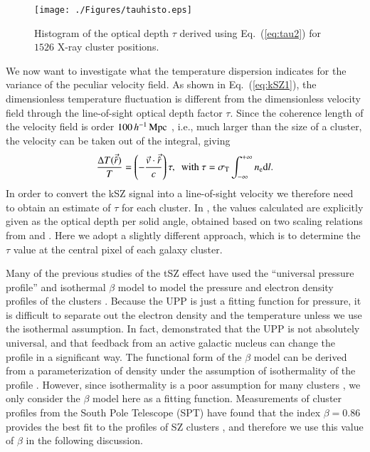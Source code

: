 \documentclass[traditabstract, longauth]{aa}
\newcommand{\1}{\'\i }
\def \der {{\rm d}}
\begin{document}
\begin{figure}
\centering
\texttt{[image: ./Figures/tauhisto.eps]}
\caption[fig:tau]{Histogram of the optical depth $\tau$ derived using
Eq.~(\ref{eq:tau2}) for $1526$ X-ray cluster positions.}
\label{fig:tau}
\end{figure}

We now want to investigate what the temperature dispersion indicates for the
variance of the peculiar velocity field. As shown in Eq.~(\ref{eq:kSZ1}), the
dimensionless temperature fluctuation is different from the dimensionless
velocity field through the line-of-sight optical depth factor $\tau$. Since the coherence
length of the velocity field is order $100\,h^{-1}\,{\rm Mpc}$
\citep{planck2015-XXXVII}, i.e., much larger than the size of a cluster,
the velocity can be taken out of the integral,
giving
\begin{eqnarray}
  \frac{\Delta T(\vec{\hat{r}})}{T} =\left(-\frac{\vec{v}\cdot
  \vec{\hat{r}}}{c} \right)\tau, \,\,\, {\rm with}\ \tau=\sigma_{\rm
  T}\int^{+\infty}_{-\infty} n_{\rm e}\der l.
\end{eqnarray}
In order to convert the kSZ signal into a line-of-sight velocity we
therefore need to obtain an estimate of $\tau$ for each
cluster. In \cite{planck2013-XIII}, the values calculated are explicitly given
as the optical depth per solid angle, obtained based on two scaling
relations from \cite{Arnaud05} and \cite{Arnaud10}. Here we adopt a slightly
different approach, which is to determine the $\tau$ value at the central
pixel of each galaxy cluster.

Many of the previous studies of the tSZ effect have used the ``universal
pressure profile'' \citep[UPP,][]{Arnaud10,planck2012-V} and isothermal
$\beta$ model \citep{Cavaliere76,Cavaliere78} to model the pressure and
electron density profiles of the
clusters \citep{Grego00,bensonetal03,Benson04,Hallman07,Halverson09,Plagge10}.
Because the UPP is just a fitting function for pressure, it is difficult to
separate out the electron density and the temperature unless we use
the isothermal assumption. In fact,  \citet{Battaglia12} demonstrated that the
UPP is not absolutely universal, and that feedback from an active galactic
nucleus can change the profile in a significant way. The functional form of the
$\beta$ model can be derived from a parameterization of density under the
assumption of isothermality of the profile \citep[e.g.,][]{Sarazin86}.
However, since isothermality is a poor assumption for many
clusters \citep{planck2012-V}, we only consider the $\beta$ model here as a
fitting function. Measurements of cluster profiles from the South Pole
Telescope (SPT) have found that the index $\beta=0.86$ provides the best fit
to the profiles of SZ clusters \citep{Plagge10}, and therefore we use this value
of $\beta$ in the following discussion.
\end{document}
